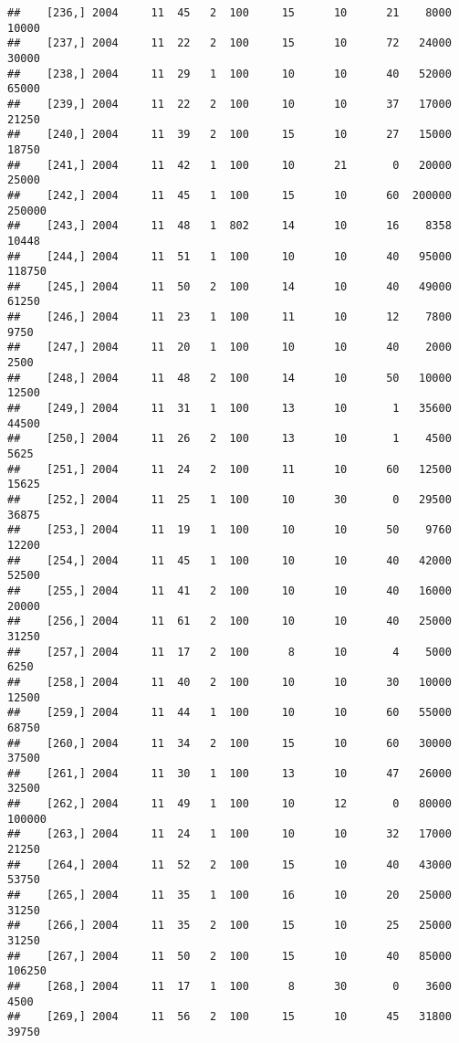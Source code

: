 \documentclass{article}\usepackage[]{graphicx}\usepackage[]{color}
\makeatletter
\newenvironment{kframe}{%
 \def\at@end@of@kframe{}%
 \ifinner\ifhmode%
  \def\at@end@of@kframe{\end{minipage}}%
  \begin{minipage}{\columnwidth}%
 \fi\fi%
 \def\FrameCommand##1{\hskip\@totalleftmargin \hskip-\fboxsep
 \colorbox{shadecolor}{##1}\hskip-\fboxsep
     \hskip-\linewidth \hskip-\@totalleftmargin \hskip\columnwidth}%
 \MakeFramed {\advance\hsize-\width
   \@totalleftmargin\z@ \linewidth\hsize
   \@setminipage}}%
 {\par\unskip\endMakeFramed%
 \at@end@of@kframe}
\newenvironment{knitrout}{}{} %
\makeatother
\begin{document}
\begin{knitrout}
\begin{kframe}
\begin{verbatim}
##    [236,] 2004     11  45   2  100     15      10      21    8000   10000
##    [237,] 2004     11  22   2  100     15      10      72   24000   30000
##    [238,] 2004     11  29   1  100     10      10      40   52000   65000
##    [239,] 2004     11  22   2  100     10      10      37   17000   21250
##    [240,] 2004     11  39   2  100     15      10      27   15000   18750
##    [241,] 2004     11  42   1  100     10      21       0   20000   25000
##    [242,] 2004     11  45   1  100     15      10      60  200000  250000
##    [243,] 2004     11  48   1  802     14      10      16    8358   10448
##    [244,] 2004     11  51   1  100     10      10      40   95000  118750
##    [245,] 2004     11  50   2  100     14      10      40   49000   61250
##    [246,] 2004     11  23   1  100     11      10      12    7800    9750
##    [247,] 2004     11  20   1  100     10      10      40    2000    2500
##    [248,] 2004     11  48   2  100     14      10      50   10000   12500
##    [249,] 2004     11  31   1  100     13      10       1   35600   44500
##    [250,] 2004     11  26   2  100     13      10       1    4500    5625
##    [251,] 2004     11  24   2  100     11      10      60   12500   15625
##    [252,] 2004     11  25   1  100     10      30       0   29500   36875
##    [253,] 2004     11  19   1  100     10      10      50    9760   12200
##    [254,] 2004     11  45   1  100     10      10      40   42000   52500
##    [255,] 2004     11  41   2  100     10      10      40   16000   20000
##    [256,] 2004     11  61   2  100     10      10      40   25000   31250
##    [257,] 2004     11  17   2  100      8      10       4    5000    6250
##    [258,] 2004     11  40   2  100     10      10      30   10000   12500
##    [259,] 2004     11  44   1  100     10      10      60   55000   68750
##    [260,] 2004     11  34   2  100     15      10      60   30000   37500
##    [261,] 2004     11  30   1  100     13      10      47   26000   32500
##    [262,] 2004     11  49   1  100     10      12       0   80000  100000
##    [263,] 2004     11  24   1  100     10      10      32   17000   21250
##    [264,] 2004     11  52   2  100     15      10      40   43000   53750
##    [265,] 2004     11  35   1  100     16      10      20   25000   31250
##    [266,] 2004     11  35   2  100     15      10      25   25000   31250
##    [267,] 2004     11  50   2  100     15      10      40   85000  106250
##    [268,] 2004     11  17   1  100      8      30       0    3600    4500
##    [269,] 2004     11  56   2  100     15      10      45   31800   39750

\end{verbatim}
\end{kframe}
\end{knitrout}
\end{document}
